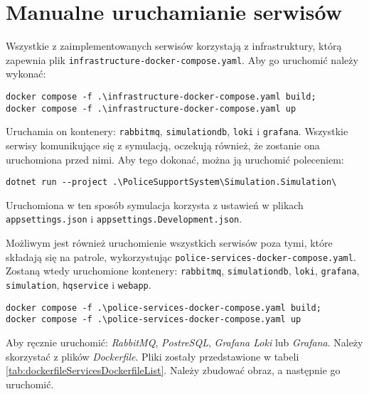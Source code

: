 \section{Manualne uruchamianie serwisów}

\par Wszystkie z zaimplementowanych serwisów korzystają z infrastruktury, którą zapewnia plik \texttt{infrastructure-docker-compose.yaml}. Aby go uruchomić należy wykonać:
\begin{verbatim}
docker compose -f .\infrastructure-docker-compose.yaml build;
docker compose -f .\infrastructure-docker-compose.yaml up
\end{verbatim}
Uruchamia on kontenery: \texttt{rabbitmq}, \texttt{simulationdb}, \texttt{loki} i \texttt{grafana}. Wszystkie serwisy komunikujące się z symulacją, oczekują również, że zostanie ona uruchomiona przed nimi. Aby tego dokonać, można ją uruchomić poleceniem:
\begin{verbatim}
dotnet run --project .\PoliceSupportSystem\Simulation.Simulation\
\end{verbatim}
Uruchomiona w ten sposób symulacja korzysta z ustawień w plikach \texttt{appsettings.json} i \texttt{appsettings.Development.json}.

\par Możliwym jest również uruchomienie wszystkich serwisów poza tymi, które składają się na patrole, wykorzystując \texttt{police-services-docker-compose.yaml}. Zostaną wtedy uruchomione kontenery: \texttt{rabbitmq}, \texttt{simulationdb}, \texttt{loki}, \texttt{grafana}, \texttt{simulation}, \texttt{hqservice} i \texttt{webapp}.
\begin{verbatim}
docker compose -f .\police-services-docker-compose.yaml build;
docker compose -f .\police-services-docker-compose.yaml up
\end{verbatim}

\par Aby ręcznie uruchomić: \emph{RabbitMQ}, \emph{PostreSQL}, \emph{Grafana Loki} lub \emph{Grafana}. Należy skorzystać z plików \emph{Dockerfile}. Pliki zostały przedstawione w tabeli \ref{tab:dockerfileServicesDockerfileList}. Należy zbudować obraz, a następnie go uruchomić.

